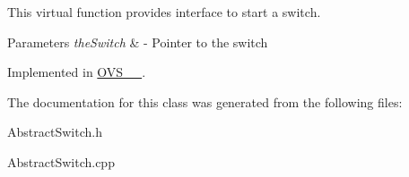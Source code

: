 \-This virtual function provides interface to start a switch. 


\begin{DoxyParams}{\-Parameters}
{\em the\-Switch} & -\/ \-Pointer to the switch \\
\hline
\end{DoxyParams}


\-Implemented in \hyperlink{classOVS__1__10_a95a3d85c485d31894781399659131785}{\-O\-V\-S\-\_\-\_}.



\-The documentation for this class was generated from the following files\-:\begin{DoxyCompactItemize}
\item 
\-Abstract\-Switch.\-h\item 
\-Abstract\-Switch.\-cpp\end{DoxyCompactItemize}
